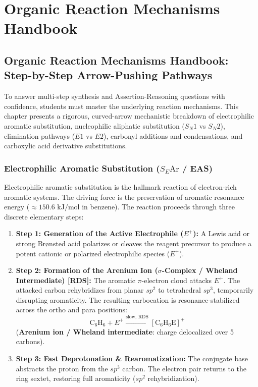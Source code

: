 \documentclass[10pt,twoside,openright]{book}
\begin{document}
\part{Organic Reaction Mechanisms Handbook}

\chapter{Organic Reaction Mechanisms Handbook: Step-by-Step Arrow-Pushing Pathways}

To answer multi-step synthesis and Assertion-Reasoning questions with confidence, students must master the underlying reaction mechanisms. This chapter presents a rigorous, curved-arrow mechanistic breakdown of electrophilic aromatic substitution, nucleophilic aliphatic substitution ($S_N1$ vs $S_N2$), elimination pathways ($E1$ vs $E2$), carbonyl additions and condensations, and carboxylic acid derivative substitutions.

\section{Electrophilic Aromatic Substitution (\texorpdfstring{$S_E\mathrm{Ar}$}{SEAr} / EAS)}

\begin{conceptbox}
Electrophilic aromatic substitution is the hallmark reaction of electron-rich aromatic systems. The driving force is the preservation of aromatic resonance energy ($\approx 150.6\text{ kJ/mol}$ in benzene). The reaction proceeds through three discrete elementary steps:
\begin{enumerate}[leftmargin=*]
  \item \textbf{Step 1: Generation of the Active Electrophile ($E^+$):} A Lewis acid or strong Br{\o}nsted acid polarizes or cleaves the reagent precursor to produce a potent cationic or polarized electrophilic species ($E^+$).
  \item \textbf{Step 2: Formation of the Arenium Ion ($\sigma$-Complex / Wheland Intermediate) [RDS]:} The aromatic $\pi$-electron cloud attacks $E^+$. The attacked carbon rehybridizes from planar $sp^2$ to tetrahedral $sp^3$, temporarily disrupting aromaticity. The resulting carbocation is resonance-stabilized across the ortho and para positions:
  \begin{equation}
    \mathrm{C_6H_6} + E^+ \xrightarrow{\text{slow, RDS}} [\mathrm{C_6H_6E}]^+
  \end{equation}
  (\textbf{Arenium ion / Wheland intermediate}: charge delocalized over 5 carbons).
  \item \textbf{Step 3: Fast Deprotonation \& Rearomatization:} The conjugate base abstracts the proton from the $sp^3$ carbon. The electron pair returns to the ring sextet, restoring full aromaticity ($sp^2$ rehybridization).
\end{enumerate}
\end{conceptbox}
\end{document}
